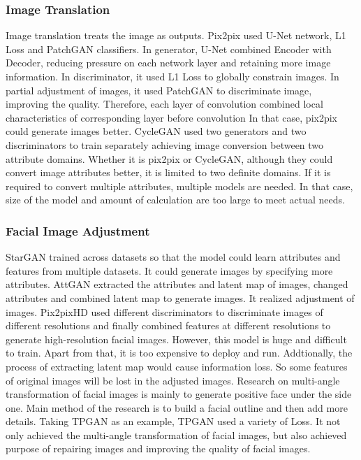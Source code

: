\subsubsection*{Image Translation}
Image translation treats the image as outputs.
Pix2pix used U-Net network, L1 Loss and PatchGAN classifiers.
In generator, U-Net combined Encoder with Decoder,
    reducing pressure on each network layer and retaining more image information.
In discriminator, it used L1 Loss to globally constrain images.
In partial adjustment of images,
    it used PatchGAN to discriminate image, improving the quality.
Therefore, each layer of convolution combined local characteristics of corresponding layer before convolution
    In that case, pix2pix could generate images better.
CycleGAN used two generators and two discriminators to train separately achieving image conversion between two attribute domains.
Whether it is pix2pix or CycleGAN,
    although they could convert image attributes better,
    it is limited to two definite domains.
If it is required to convert multiple attributes, multiple models are needed.
In that case, size of the model and amount of calculation are too large to meet actual needs.

\subsubsection*{Facial Image Adjustment}
StarGAN trained across datasets so that the model could learn attributes and features from multiple datasets.
It could generate images by specifying more attributes.
AttGAN extracted the attributes and latent map of images,
    changed attributes and combined latent map to generate images.
    It realized adjustment of images.
Pix2pixHD used different discriminators to discriminate images of different resolutions
    and finally combined features at different resolutions to generate high-resolution facial images.
However, this model is huge and difficult to train.
Apart from that, it is too expensive to deploy and run.
Addtionally, the process of extracting latent map would cause information loss.
So some features of original images will be lost in the adjusted images.
Research on multi-angle transformation of facial images is mainly to generate positive face under the side one.
Main method of the research is to build a facial outline and then add more details.
Taking TPGAN as an example, TPGAN used a variety of Loss.
    It not only achieved the multi-angle transformation of facial images,
    but also achieved purpose of repairing images and improving the quality of facial images.

